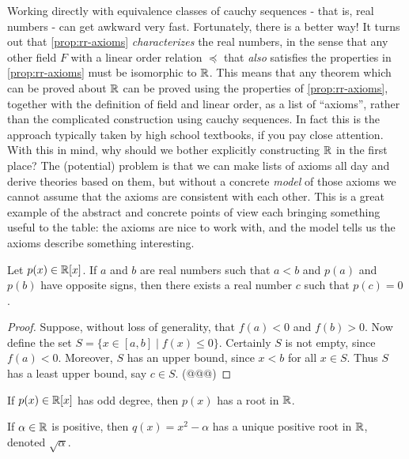 Working directly with equivalence classes of cauchy sequences - that is, real numbers - can get awkward very fast.
Fortunately, there is a better way! It turns out that \ref{prop:rr-axioms} \emph{characterizes} the real numbers, in the sense that any other field \(F\) with a linear order relation \(\preceq\) that \emph{also} satisfies the properties in \ref{prop:rr-axioms} must be isomorphic to \(\mathbb{R}\).
This means that any theorem which can be proved about \(\mathbb{R}\) can be proved using the properties of \ref{prop:rr-axioms}, together with the definition of field and linear order, as a list of ``axioms'', rather than the complicated construction using cauchy sequences.
In fact this is the approach typically taken by high school textbooks, if you pay close attention.
With this in mind, why should we bother explicitly constructing \(\mathbb{R}\) in the first place? The (potential) problem is that we can make lists of axioms all day and derive theories based on them, but without a concrete \emph{model} of those axioms we cannot assume that the axioms are consistent with each other.
This is a great example of the abstract and concrete points of view each bringing something useful to the table: the axioms are nice to work with, and the model tells us the axioms describe something interesting.

\begin{prop}
Let \(p(x) \in \mathbb{R}[x]\).
If \(a\) and \(b\) are real numbers such that \(a < b\) and \(p(a)\) and \(p(b)\) have opposite signs, then there exists a real number \(c\) such that \(p(c) = 0\).
\end{prop}

\begin{proof}
Suppose, without loss of generality, that \(f(a) < 0\) and \(f(b) > 0\).
Now define the set \(S = \{ x \in [a,b] \mid f(x) \leq 0 \}\).
Certainly \(S\) is not empty, since \(f(a) < 0\).
Moreover, \(S\) has an upper bound, since \(x < b\) for all \(x \in S\).
Thus \(S\) has a least upper bound, say \(c \in S\).
(@@@)
\end{proof}

\begin{cor} \mbox{}
\begin{proplist}
\item If \(p(x) \in \mathbb{R}[x]\) has odd degree, then \(p(x)\) has a root in \(\mathbb{R}\).
\item If \(\alpha \in \mathbb{R}\) is positive, then \(q(x) = x^2 - \alpha\) has a unique positive root in \(\mathbb{R}\), denoted \(\sqrt{\alpha}\).
\end{proplist}
\end{cor}


